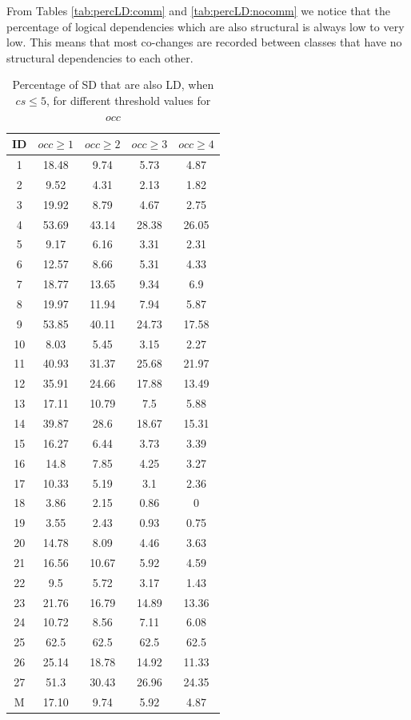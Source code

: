 \documentclass[a4paper,twoside]{article}
\begin{document}
From Tables \ref{tab:percLD:comm} and \ref{tab:percLD:nocomm} we notice that the percentage of logical dependencies which are also structural is always low to very low. This means that most co-changes are recorded between classes that have no structural dependencies to each other.   
 
\begin{table}[!h]
\renewcommand{\arraystretch}{1.1}
\caption{Percentage of SD that are also LD,  when $cs \leq 5$, for different threshold values for $occ$}
\label{table:10}
\centering
\begin{tabular}{|c|c|c|c|c|}
\hline
    ID  & $occ\geq 1$ & $occ\geq 2$ & $occ\geq 3$ & $occ\geq 4$  \\
\hline
1	&	18.48	&	9.74	&	5.73	&	4.87	\\
2	&	9.52	&	4.31	&	2.13	&	1.82	\\
3	&	19.92	&	8.79	&	4.67	&	2.75	\\
4	&	53.69	&	43.14	&	28.38	&	26.05	\\
5	&	9.17	&	6.16	&	3.31	&	2.31	\\
6	&	12.57	&	8.66	&	5.31	&	4.33	\\
7	&	18.77	&	13.65	&	9.34	&	6.9	\\
8	&	19.97	&	11.94	&	7.94	&	5.87	\\
9	&	53.85	&	40.11	&	24.73	&	17.58	\\
10	&	8.03	&	5.45	&	3.15	&	2.27	\\
11	&	40.93	&	31.37	&	25.68	&	21.97	\\
12	&	35.91	&	24.66	&	17.88	&	13.49	\\
13	&	17.11	&	10.79	&	7.5	&	5.88	\\
14	&	39.87	&	28.6	&	18.67	&	15.31	\\
15	&	16.27	&	6.44	&	3.73	&	3.39	\\
16	&	14.8	&	7.85	&	4.25	&	3.27	\\
17	&	10.33	&	5.19	&	3.1	&	2.36	\\
18	&	3.86	&	2.15	&	0.86	&	0	\\
19	&	3.55	&	2.43	&	0.93	&	0.75	\\
20	&	14.78	&	8.09	&	4.46	&	3.63	\\
21	&	16.56	&	10.67	&	5.92	&	4.59	\\
22	&	9.5	&	5.72	&	3.17	&	1.43	\\
23	&	21.76	&	16.79	&	14.89	&	13.36	\\
24	&	10.72	&	8.56	&	7.11	&	6.08	\\
25	&	62.5	&	62.5	&	62.5	&	62.5	\\
26	&	25.14	&	18.78	&	14.92	&	11.33	\\
27	&	51.3	&	30.43	&	26.96	&	24.35	\\
\hline
M	&	17.10&	9.74	&	5.92	&	4.87	\\

\hline
\end{tabular}
\end{table}
\end{document}
